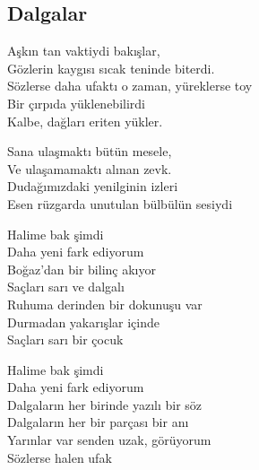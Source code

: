 \subsection{Dalgalar}

Aşkın tan vaktiydi bakışlar, \\
Gözlerin kaygısı sıcak teninde biterdi. \\
Sözlerse daha ufaktı o zaman, yüreklerse toy \\
Bir çırpıda yüklenebilirdi \\
Kalbe, dağları eriten yükler.

\noindent\newline
Sana ulaşmaktı bütün mesele, \\
Ve ulaşamamaktı alınan zevk. \\
Dudağımızdaki yenilginin izleri \\
Esen rüzgarda unutulan bülbülün sesiydi

\noindent\newline
Halime bak şimdi \\
Daha yeni fark ediyorum \\
Boğaz'dan bir bilinç akıyor \\
Saçları sarı ve dalgalı \\
Ruhuma derinden bir dokunuşu var \\
Durmadan yakarışlar içinde \\
Saçları sarı bir çocuk

\noindent\newline
Halime bak şimdi \\
Daha yeni fark ediyorum \\
Dalgaların her birinde yazılı bir söz \\
Dalgaların her bir parçası bir anı \\
Yarınlar var senden uzak, görüyorum \\
Sözlerse halen ufak \\